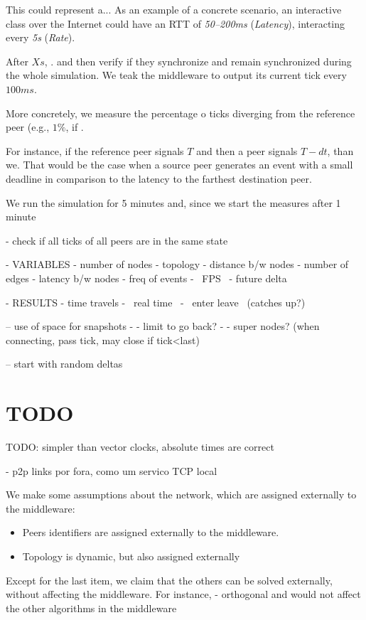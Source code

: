 \documentclass[10pt,journal,compsoc]{IEEEtran}
\begin{document}
This could represent a...
As an example of a concrete scenario, an interactive class over the Internet
could have
    an RTT of \emph{50--200ms} (\emph{Latency}),
    interacting every \emph{5s} (\emph{Rate}).

After $Xs$, .
and then verify if they synchronize and remain synchronized during the whole
simulation.
We teak the middleware to output its current tick every $100ms$.

More concretely, we measure the percentage o ticks diverging from the reference
peer (e.g., $1\%$, if .

For instance, if the reference peer signals $T$ and then a peer signals $T-dt$,
than we.
That would be the case when a source peer generates an event with a small
deadline in comparison to the latency to the farthest destination peer.

We run the simulation for 5 minutes and, since we start the measures after 1 minute

- check if all ticks of all peers are in the same state

- VARIABLES
- number of nodes
- topology
    - distance b/w nodes
    - number of edges
- latency b/w nodes
- freq of events
- ~FPS~
- future delta

- RESULTS
- time travels
- ~real time~
- ~enter leave~ (catches up?)

-- use of space for snapshots
-    - limit to go back?
-    - super nodes? (when connecting, pass tick, may close if tick<last)

-- start with random deltas
\section{TODO}

TODO: simpler than vector clocks, absolute times are correct

- p2p links por fora, como um servico TCP local

We make some assumptions about the network, which are assigned externally to
the middleware:
%
\begin{itemize}
\item Peers identifiers are assigned externally to the middleware.
\item Topology is dynamic, but also assigned externally

\end{itemize}
%
Except for the last item, we claim that the others can be solved externally,
without affecting the middleware.
For instance,
- orthogonal and would not affect the other algorithms in the middleware
\end{document}
